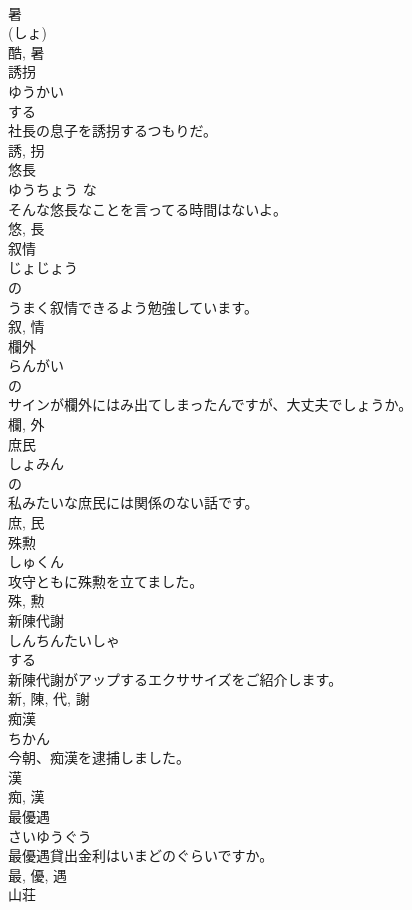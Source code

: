\documentclass[8pt]{extreport}
\begin{document}
\begin{CJK}{UTF8}{min}
\\	暑 
\\	(しょ) 
\\	酷, 暑	
\\	誘拐	
\\	ゆうかい	
\\	する 
\\	社長の息子を誘拐するつもりだ。	
\\	誘, 拐	
\\	悠長	
\\	ゆうちょう	な 
\\	そんな悠長なことを言ってる時間はないよ。	
\\	悠, 長	
\\	叙情	
\\	じょじょう	
\\	の 
\\	うまく叙情できるよう勉強しています。	
\\	叙, 情	
\\	欄外	
\\	らんがい	
\\	の 
\\	サインが欄外にはみ出てしまったんですが、大丈夫でしょうか。	
\\	欄, 外	
\\	庶民	
\\	しょみん	
\\	の 
\\	私みたいな庶民には関係のない話です。	
\\	庶, 民	
\\	殊勲	
\\	しゅくん	
\\	攻守ともに殊勲を立てました。	
\\	殊, 勲	
\\	新陳代謝	
\\	しんちんたいしゃ	
\\	する 
\\	新陳代謝がアップするエクササイズをご紹介します。	
\\	新, 陳, 代, 謝	
\\	痴漢	
\\	ちかん	
\\	今朝、痴漢を逮捕しました。	
\\	漢 
\\	痴, 漢	
\\	最優遇	
\\	さいゆうぐう	
\\	最優遇貸出金利はいまどのぐらいですか。	
\\	最, 優, 遇	
\\	山荘	

\end{CJK}
\end{document}
